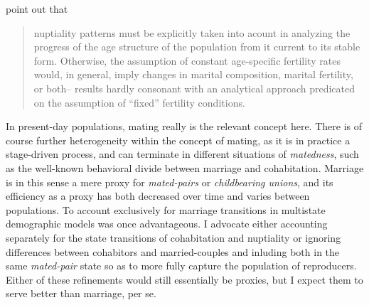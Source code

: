 
\citet{stolnitz1949recent} point out that 

\begin{quote}
nuptiality patterns
must be explicitly taken into acount in analyzing the progress of the age structure of the
population from it current to its stable form. Otherwise, the assumption of
constant age-specific fertility rates would, in general, imply changes in
marital composition, marital fertility, or both-- results hardly consonant with
an analytical approach predicated on the assumption of ``fixed'' fertility
conditions.
\end{quote}

In present-day populations, mating really is the relevant concept here. There is
of course further heterogeneity within the concept of mating, as it is in
practice a stage-driven process, and can terminate in different situations of
\textit{matedness}, such as the well-known behavioral divide between marriage
and cohabitation. Marriage is in this sense a mere proxy for
\textit{mated-pairs} or \textit{childbearing unions}, and its efficiency as a
proxy has both decreased over time and varies between populations. To account exclusively for marriage transitions
in multistate demographic models was once advantageous. I
advocate either accounting separately for the state transitions of cohabitation
and nuptiality or ignoring differences between cohabitors and married-couples
and inluding both in the same \textit{mated-pair} state so as to more fully
capture the population of reproducers. Either of these refinements would still
essentially be proxies, but I expect them to serve better than marriage, per se.

